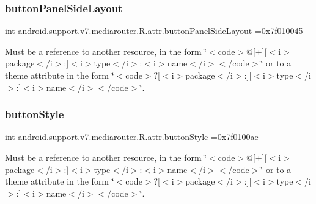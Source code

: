 \subsubsection{\texorpdfstring{button\+Panel\+Side\+Layout}{buttonPanelSideLayout}}
{\footnotesize\ttfamily int android.\+support.\+v7.\+mediarouter.\+R.\+attr.\+button\+Panel\+Side\+Layout =0x7f010045\hspace{0.3cm}{\ttfamily [static]}}

Must be a reference to another resource, in the form \char`\"{}$<$code$>$@\mbox{[}+\mbox{]}\mbox{[}$<$i$>$package$<$/i$>$\+:\mbox{]}$<$i$>$type$<$/i$>$\+:$<$i$>$name$<$/i$>$$<$/code$>$\char`\"{} or to a theme attribute in the form \char`\"{}$<$code$>$?\mbox{[}$<$i$>$package$<$/i$>$\+:\mbox{]}\mbox{[}$<$i$>$type$<$/i$>$\+:\mbox{]}$<$i$>$name$<$/i$>$$<$/code$>$\char`\"{}. \mbox{\label{classandroid_1_1support_1_1v7_1_1mediarouter_1_1R_1_1attr_a3104a420f7d9779d4be5ae4155378c1e}} 
\subsubsection{\texorpdfstring{button\+Style}{buttonStyle}}
{\footnotesize\ttfamily int android.\+support.\+v7.\+mediarouter.\+R.\+attr.\+button\+Style =0x7f0100ae\hspace{0.3cm}{\ttfamily [static]}}

Must be a reference to another resource, in the form \char`\"{}$<$code$>$@\mbox{[}+\mbox{]}\mbox{[}$<$i$>$package$<$/i$>$\+:\mbox{]}$<$i$>$type$<$/i$>$\+:$<$i$>$name$<$/i$>$$<$/code$>$\char`\"{} or to a theme attribute in the form \char`\"{}$<$code$>$?\mbox{[}$<$i$>$package$<$/i$>$\+:\mbox{]}\mbox{[}$<$i$>$type$<$/i$>$\+:\mbox{]}$<$i$>$name$<$/i$>$$<$/code$>$\char`\"{}. \mbox{\label{classandroid_1_1support_1_1v7_1_1mediarouter_1_1R_1_1attr_ae5673ab51625b9587786678823cd5110}} 
